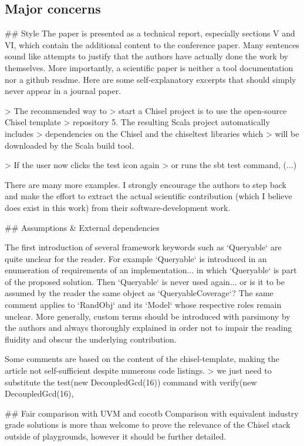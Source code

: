 \documentclass{article}
\begin{document}
\subsection*{Major concerns}
\#\# Style
The paper is presented as a technical report, especially sections V and VI, which contain the additional content to the conference paper.
Many sentences sound like attempts to justify that the authors have actually done the work by themselves. 
More importantly, a scientific paper is neither a tool documentation nor a github readme.
Here are some self-explanatory excerpts that should simply never appear in a journal paper.

> The recommended way to
> start a Chisel project is to use the open-source Chisel template
> repository 5. The resulting Scala project automatically includes
> dependencies on the Chisel and the chiseltest libraries which
> will be downloaded by the Scala build tool.

> If the user now clicks the test icon again
> or runs the sbt test command, (...)

There are many more examples. 
I strongly encourage the authors to step back and make the effort to extract the actual scientific contribution (which I believe does exist in this work) from their software-development work.

\#\# Assumptions \& External dependencies

The first introduction of several framework keywords such as `Queryable` are quite unclear for the reader.
For example `Queryable` is introduced in an enumeration of requirements of an implementation... in which `Queryable` is part of the proposed solution.
Then `Queryable` is never used again... or is it to be assumed by the reader the same object as `QueryableCoverage`?
The same comment applies to `RandObj` and its `Model` whose respective roles remain unclear.
More generally, custom terms should be introduced with parsimony by the authors and always thoroughly explained in order not to impair the reading fluidity and obscur the underlying contribution.

Some comments are based on the content of the chisel-template, making the article not self-sufficient despite numerous code listings.
> we just need to substitute the test(new DecoupledGcd(16)) command with verify(new DecoupledGcd(16),


\#\# Fair comparison with UVM and cocotb
Comparison with equivalent industry grade solutions is more than welcome to prove the relevance of the Chisel stack outside of playgrounds, however it should be further detailed.
\end{document}
